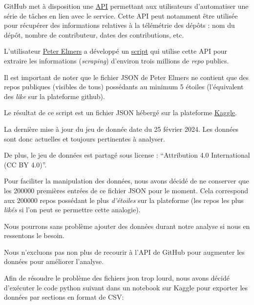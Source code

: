 \documentclass[
]{article}
\begin{document}
GitHub met à disposition une
\href{https://docs.github.com/en/rest/about-the-rest-api/about-the-rest-api?apiVersion=2022-11-28}{API}
permettant aux utilisateurs d'automatiser une série de tâches en lien
avec le service. Cette API peut notamment être utilisée pour récupérer
des informations relatives à la télémétrie des dépôts : nom du dépôt,
nombre de contributeur, dates des contributions, etc.

L'utilisateur \href{https://pelmers.com/blog/}{Peter Elmers} a développé
un \href{https://github.com/pelmers/github-repository-metadata}{script}
qui utilise cette API pour extraire les informations (\emph{scraping})
d'environ trois millions de \emph{repo} publics.

Il est important de noter que le fichier JSON de Peter Elmers ne
contient que des repos publiques (visibles de tous) possédants au
minimum 5 étoiles (l'équivalent des \emph{like} sur la plateforme
github).

Le résultat de ce script est un fichier JSON hébergé sur la plateforme
\href{https://www.kaggle.com/datasets/pelmers/github-repository-metadata-with-5-stars/data}{Kaggle}.

La dernière mise à jour du jeu de donnée date du 25 février 2024. Les
données sont donc actuelles et toujours pertinentes à analyser.

De plus, le jeu de données est partagé sous license : ``Attribution 4.0
International (CC BY 4.0)''.

Pour faciliter la manipulation des données, nous avons décidé de ne
conserver que les 200000 premières entrées de ce fichier JSON pour le
moment. Cela correspond aux 200000 repos possédant le plus
\emph{d'étoiles} sur la plateforme (les repos les plus \emph{likés} si
l'on peut se permettre cette analogie).

Nous pourrons sans problème ajouter des données durant notre analyse si
nous en ressentons le besoin.

Nous n'excluons pas non plus de recourir à l'API de GitHub pour
augmenter les données pour améliorer l'analyse.

Afin de résoudre le problème des fichiers json trop lourd, nous avons
décidé d'exécuter le code python suivant dans un notebook sur Kaggle
pour exporter les données par sections en format de CSV:
\end{document}

